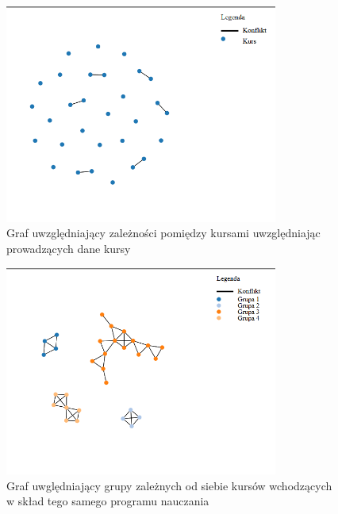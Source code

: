 \begin{figure}[H]
  \caption{Graf uwzględniający zależności pomiędzy kursami uwzględniając prowadzących dane kursy}
  \centering
    \includegraphics[width=0.8\textwidth]{test1_teach.PNG}
\end{figure}
\begin{figure}[H]
  \caption{Graf uwględniający grupy zależnych od siebie kursów wchodzących w skład tego samego programu nauczania}
  \centering
    \includegraphics[width=0.8\textwidth]{test1_con.PNG}
\end{figure}
